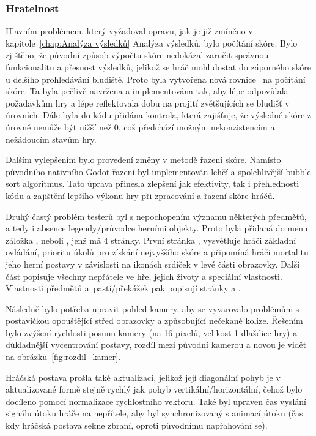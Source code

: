 \subsubsection*{\textbullet Hratelnost}
Hlavním problémem, který vyžadoval opravu, jak je již zmíněno v kapitole~\ref{chap:Analýza výsledků} Analýza výsledků, bylo počítání skóre. Bylo zjištěno, že původní způsob výpočtu skóre nedokázal zaručit správnou funkcionalitu a přesnost výsledků, jelikož se hráč mohl dostat do záporného skóre u delšího prohledávání bludiště. Proto byla vytvořena nová rovnice~ na počítání skóre. Ta byla pečlivě navržena a implementována tak, aby lépe odpovídala požadavkům hry a lépe reflektovala dobu na projití zvětšujících se bludišť v úrovních. Dále byla do kódu přidána kontrola, která zajišťuje, že výsledné skóre z úrovně nemůže být nižší než 0, což předchází možným nekonzistencím a nežádoucím stavům hry.

Dalším vylepšením bylo provedení změny v metodě řazení skóre. Namísto původního nativního Godot řazení byl implementován lehčí a spolehlivější bubble sort algoritmus. Tato úprava přinesla zlepšení jak efektivity, tak i přehlednosti kódu a zajištění lepšího výkonu hry při zpracování a řazení skóre hráčů.

Druhý častý problém testerů byl s nepochopením významu některých předmětů, a tedy i absence legendy/průvodce herními objekty. Proto byla přidaná do menu záložka , neboli , jenž má 4 stránky. První stránka , vysvětluje hráči základní ovládání, prioritu úkolů pro získání nejvyššího skóre a připomíná hráči mortalitu jeho herní postavy v závislosti na ikonách srdíček v levé části obrazovky. Další část  popisuje všechny nepřátele ve hře, jejich životy a speciální vlastnosti. Vlastnosti předmětů a~pastí/překážek pak popisují stránky  a .

Následně bylo potřeba upravit pohled kamery, aby se vyvarovalo problémům s postavičkou opouštějící střed obrazovky a způsobující nečekané kolize. Řešením bylo zvýšení rychlosti posunu kamery (na 16 pixelů, velikost 1 dlaždice hry) a důkladnější vycentrování postavy, rozdíl mezi původní kamerou a novou je vidět na obrázku~\ref{fig:rozdil_kamer}.

Hráčská postava prošla také aktualizací, jelikož její diagonální pohyb je v aktualizované formě stejně rychlý jak pohyb vertikální/horizontální, čehož bylo docíleno pomocí normalizace rychlostního vektoru. Také byl upraven čas vyslání signálu útoku hráče na nepřítele, aby byl synchronizovaný s animací útoku (čas kdy hráčská postava sekne zbraní, oproti původnímu napřahování se).

